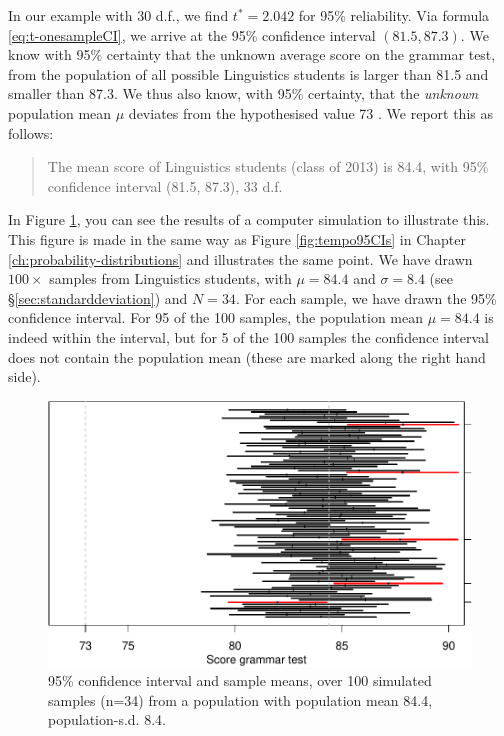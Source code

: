 \documentclass[
]{book}
\begin{document}
In our example with 30 d.f., we find \(t^*=2.042\) for 95\%
reliability. Via formula
\eqref{eq:t-onesampleCI}, we arrive at the 95\%
confidence interval \((81.5, 87.3)\). We know with 95\% certainty
that the unknown average score on the grammar test, from the population
of all possible Linguistics students is larger than 81.5 and
smaller than 87.3. We thus also know, with 95\% certainty, that the
\emph{unknown} population mean \(\mu\) deviates from the hypothesised
value 73 \citep{Cumm12}. We report this as follows:

\begin{quote}
The mean score of Linguistics students (class of 2013) is
84.4, with 95\% confidence interval (81.5, 87.3), 33 d.f.
\end{quote}

In Figure \ref{fig:gramm2013CIs}, you can see the results of
a computer simulation to illustrate this. This figure is made in the same way as Figure
\ref{fig:tempo95CIs} in Chapter \ref{ch:probability-distributions} and
illustrates the same point. We have drawn \(100\times\) samples from Linguistics students,
with \(\mu=84.4\) and \(\sigma=8.4\) (see §\ref{sec:standarddeviation}) and \(N=34\).
For each sample, we have drawn the 95\%
confidence interval. For 95 of the 100 samples, the population mean \(\mu=84.4\)
is indeed within the interval, but for 5 of the 100 samples the confidence interval does not contain the population mean (these are marked along the right hand side).

\begin{figure}
\centering
\includegraphics{QMS-EN_files/figure-latex/gramm2013CIs-1.pdf}
\caption{\label{fig:gramm2013CIs}95\% confidence interval and sample means, over 100 simulated samples (n=34) from a population with population mean 84.4, population-s.d. 8.4.}
\end{figure}
\end{document}
